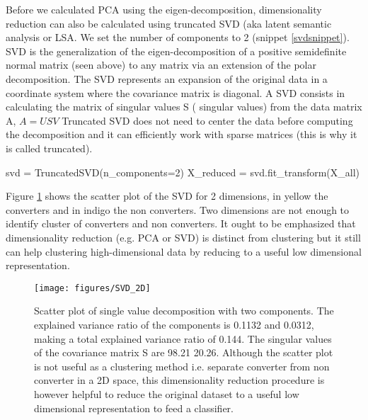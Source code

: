 \documentclass[11pt]{article}
\theoremstyle{definition}
\theoremstyle{remark}
\begin{document}
{Before we calculated PCA using the eigen-decomposition, dimensionality reduction can also be calculated using truncated SVD (aka latent semantic analysis or LSA. We set the number of components to 2 (snippet \ref{svdsnippet}).  SVD is the generalization of the eigen-decomposition of a positive semidefinite normal matrix (seen above) to any matrix via an extension of the polar decomposition. 
The SVD represents an expansion of the original data in a coordinate system where the covariance matrix is diagonal. A SVD consists in calculating the matrix of singular values S ( singular values) from the data matrix A, $A = USV$
Truncated SVD does not need to center the data before computing the decomposition and it can efficiently work with sparse matrices (this is why it is called truncated). 

\begin{code}[caption=PCA truncated SVDs, label=svdsnippet]
svd = TruncatedSVD(n_components=2)
X_reduced = svd.fit_transform(X_all)
\end{code}

Figure \ref{fig:PCASVD} shows the scatter plot of the SVD for 2 dimensions, in yellow the converters and in indigo the non converters. Two dimensions are not enough to identify cluster of converters and non converters. It ought to be emphasized that dimensionality reduction (e.g. PCA or SVD) is distinct from clustering but it still can help clustering high-dimensional data by reducing to a useful low dimensional representation.

\begin{figure}[H] 
        \centering
        \texttt{[image: figures/SVD\_2D]}
        \caption{Scatter plot of single value decomposition with two components. The explained variance ratio of the components is 0.1132 and 0.0312, making a total explained variance ratio of  0.144. The singular values of the covariance matrix S are 98.21 20.26. Although the scatter plot is not useful as a clustering method i.e. separate converter from non converter in a 2D space, this dimensionality reduction procedure is however helpful to reduce the original dataset to a useful low dimensional representation to feed a classifier. 
        } \label{fig:PCASVD}
\end{figure}

}
\end{document}
